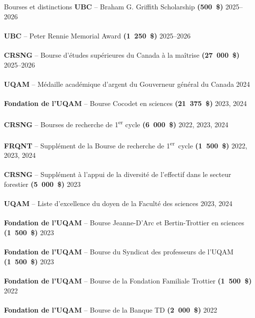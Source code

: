 \documentclass[
	11pt, %
]{resume} %
\begin{document}
\begin{rSection}{Bourses et distinctions}	
  \textbf{UBC} -- Braham G. Griffith Scholarship \textbf{(500~\$)} \hfill 2025--2026 \\
  \vspace{-2ex}\\
  \textbf{UBC} -- Peter Rennie Memorial Award \textbf{(1~250~\$)} \hfill 2025--2026 \\
	\vspace{-2ex}\\
	\textbf{CRSNG} -- Bourse d’études supérieures du Canada à la maîtrise \textbf{(27~000~\$)} \hfill 2025--2026 \\
	\vspace{-2ex}\\
	\textbf{UQAM} -- Médaille académique d’argent du Gouverneur général du Canada \hfill 2024 \\
	\vspace{-2ex}\\
	\textbf{Fondation de l'UQAM} -- Bourse Cocodet en sciences \textbf{(21~375~\$)} \hfill 2023, 2024 \\
	\vspace{-2ex}\\
	\textbf{CRSNG} -- Bourses de recherche de 1\textsuperscript{er} cycle \textbf{(6~000~\$)} \hfill 2022, 2023, 2024 \\ 
	\vspace{-2ex}\\
	\textbf{FRQNT} -- Supplément de la Bourse de recherche de 1\textsuperscript{er}~cycle \textbf{(1~500~\$)} \hfill 2022, 2023, 2024\\ 
	\vspace{-2ex}\\
	\textbf{CRSNG} -- Supplément à l’appui de la diversité de l’effectif dans le secteur forestier \textbf{(5~000~\$)} \hfill 2023 \\ 
	\vspace{-2ex}\\
	\textbf{UQAM} -- Liste d'excellence du doyen de la Faculté des sciences \hfill 2023, 2024 \\
	\vspace{-2ex}\\
	\textbf{Fondation de l'UQAM} -- Bourse Jeanne-D’Arc et Bertin-Trottier en sciences \textbf{(1~500~\$)} \hfill 2023 \\ 
	\vspace{-2ex}\\
	\textbf{Fondation de l'UQAM} -- Bourse du Syndicat des professeurs de l’UQAM \textbf{(1~500~\$)} \hfill 2023 \\ 
	\vspace{-2ex}\\
	\textbf{Fondation de l'UQAM} -- Bourse de la Fondation Familiale Trottier \textbf{(1~500~\$)} \hfill 2022 \\ 
	\vspace{-2ex}\\
	\textbf{Fondation de l'UQAM} -- Bourse de la Banque TD \textbf{(2~000~\$)} \hfill 2022 
\end{rSection}
\end{document}
